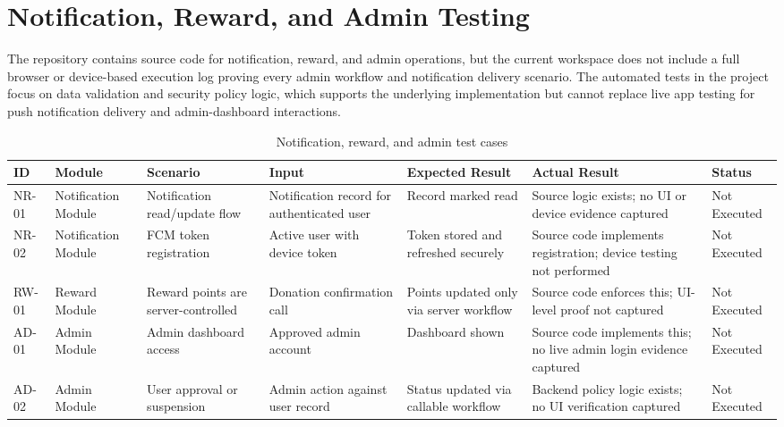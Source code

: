 
\section{Notification, Reward, and Admin Testing}

The repository contains source code for notification, reward, and admin operations, but the current workspace does not include a full browser or device-based execution log proving every admin workflow and notification delivery scenario. The automated tests in the project focus on data validation and security policy logic, which supports the underlying implementation but cannot replace live app testing for push notification delivery and admin-dashboard interactions.

\begin{table}[H]
\centering
\caption{Notification, reward, and admin test cases}
\begin{tabularx}{\textwidth}{|p{1.6cm}|p{2.7cm}|X|X|X|p{1.6cm}|p{2.5cm}|}
\hline
\textbf{ID} & \textbf{Module} & \textbf{Scenario} & \textbf{Input} & \textbf{Expected Result} & \textbf{Actual Result} & \textbf{Status} \\
\hline
NR-01 & Notification Module & Notification read/update flow & Notification record for authenticated user & Record marked read & Source logic exists; no UI or device evidence captured & Not Executed \\
\hline
NR-02 & Notification Module & FCM token registration & Active user with device token & Token stored and refreshed securely & Source code implements registration; device testing not performed & Not Executed \\
\hline
RW-01 & Reward Module & Reward points are server-controlled & Donation confirmation call & Points updated only via server workflow & Source code enforces this; UI-level proof not captured & Not Executed \\
\hline
AD-01 & Admin Module & Admin dashboard access & Approved admin account & Dashboard shown & Source code implements this; no live admin login evidence captured & Not Executed \\
\hline
AD-02 & Admin Module & User approval or suspension & Admin action against user record & Status updated via callable workflow & Backend policy logic exists; no UI verification captured & Not Executed \\
\hline
\end{tabularx}
\end{table}

